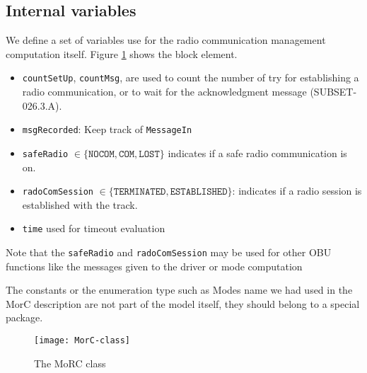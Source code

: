 \subsection{Internal variables}
\label{subsec:internalvar}


We define a set of variables use for the radio communication management
computation itself. Figure \ref{fig:Morc-class} shows the block element.
\begin{itemize}
\item \verb+countSetUp+, \verb+countMsg+, are used to count the number of try
for establishing a radio communication, or to wait for  the acknowledgment
message (SUBSET-026.3.A).
\item \verb+msgRecorded+: Keep track of \verb+MessageIn+
\item \verb+safeRadio+ $\in \{\mathtt{NOCOM, COM, LOST}\}$ indicates if a safe radio communication is on.
\item \verb+radoComSession+ $\in \{\mathtt{TERMINATED, ESTABLISHED}\}$: indicates if a radio session is established with the track.
\item \verb+time+ used for timeout evaluation
\end{itemize} 
Note that the \verb+safeRadio+ and \verb+radoComSession+ may be used for other
OBU functions like the messages given to the driver or mode computation

The constants or the enumeration type such as Modes name we had  used in the MorC
description are not part of the model itself, they should
belong to a special package.

\begin{figure}[htbp]
\centering
\texttt{[image: MorC-class]}
\caption{\label{fig:Morc-class} The MoRC class}
\end{figure}
